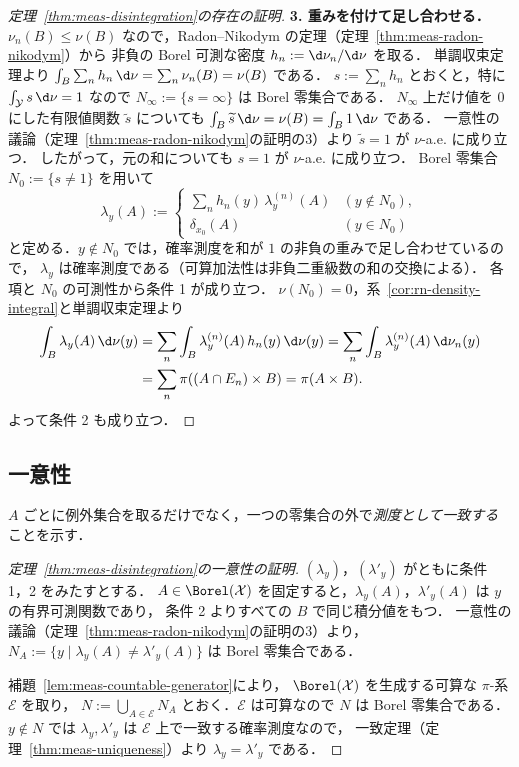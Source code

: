 \begin{proof}[定理~\ref{thm:meas-disintegration}の存在の証明]
  \textbf{3. 重みを付けて足し合わせる．}
  $\nu_n(B)\leq\nu(B)$ なので，Radon--Nikodym の定理（定理~\ref{thm:meas-radon-nikodym}）から
  非負の Borel 可測な密度 $h_n:=\d\nu_n/\d\nu$ を取る．
  単調収束定理より $\int_B\sum_nh_n\,\d\nu=\sum_n\nu_n(B)=\nu(B)$ である．
  $s:=\sum_nh_n$ とおくと，特に $\int_{\mathcal{Y}}s\,\d\nu=1$ なので
  $N_\infty:=\{s=\infty\}$ は Borel 零集合である．
  $N_\infty$ 上だけ値を $0$ にした有限値関数 $\widetilde{s}$ についても
  $\int_B\widetilde{s}\,\d\nu=\nu(B)=\int_B1\,\d\nu$ である．
  一意性の議論（定理~\ref{thm:meas-radon-nikodym}の証明の3）より $\widetilde{s}=1$ が $\nu$-a.e. に成り立つ．
  したがって，元の和についても $s=1$ が $\nu$-a.e. に成り立つ．
  Borel 零集合 $N_0:=\{s\neq1\}$ を用いて
  \[
    \lambda_y(A):=
    \begin{cases}
      \sum_nh_n(y)\,\lambda_y^{(n)}(A) & (y\notin N_0),\\
      \delta_{x_0}(A) & (y\in N_0)
    \end{cases}
  \]
  と定める．$y\notin N_0$ では，確率測度を和が $1$ の非負の重みで足し合わせているので，
  $\lambda_y$ は確率測度である（可算加法性は非負二重級数の和の交換による）．
  各項と $N_0$ の可測性から条件 1 が成り立つ．
  $\nu(N_0)=0$，系~\ref{cor:rn-density-integral}と単調収束定理より
  \[
    \begin{aligned}
      \int_B\lambda_y(A)\,\d\nu(y)
      &=\sum_n\int_B\lambda_y^{(n)}(A)\,h_n(y)\,\d\nu(y)
      =\sum_n\int_B\lambda_y^{(n)}(A)\,\d\nu_n(y)\\
      &=\sum_n\pi((A\cap E_n)\times B)=\pi(A\times B).
    \end{aligned}
  \]
  よって条件 2 も成り立つ．
\end{proof}

\subsection{一意性}

$A$ ごとに例外集合を取るだけでなく，一つの零集合の外で\emph{測度として一致する}ことを示す．

\begin{proof}[定理~\ref{thm:meas-disintegration}の一意性の証明]
  $(\lambda_y)$，$(\lambda'_y)$ がともに条件 1，2 をみたすとする．
  $A\in\Borel(\mathcal{X})$ を固定すると，$\lambda_y(A)$，$\lambda'_y(A)$ は $y$ の有界可測関数であり，
  条件 2 よりすべての $B$ で同じ積分値をもつ．
  一意性の議論（定理~\ref{thm:meas-radon-nikodym}の証明の3）より，
  $N_A:=\{y\mid\lambda_y(A)\neq\lambda'_y(A)\}$ は Borel 零集合である．

  補題~\ref{lem:meas-countable-generator}により，
  $\Borel(\mathcal{X})$ を生成する可算な $\pi$-系 $\mathcal{E}$ を取り，
  $N:=\bigcup_{A\in\mathcal{E}}N_A$ とおく．$\mathcal{E}$ は可算なので $N$ は Borel 零集合である．
  $y\notin N$ では $\lambda_y,\lambda'_y$ は $\mathcal{E}$ 上で一致する確率測度なので，
  一致定理（定理~\ref{thm:meas-uniqueness}）より $\lambda_y=\lambda'_y$ である．
\end{proof}
